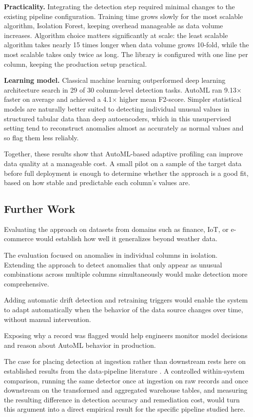 \documentclass[12pt]{article}
\begin{document}
\textbf{Practicality.} Integrating the detection step required minimal changes to the existing pipeline configuration. Training time grows slowly for the most scalable algorithm, Isolation Forest, keeping overhead manageable as data volume increases. Algorithm choice matters significantly at scale: the least scalable algorithm takes nearly 15 times longer when data volume grows 10-fold, while the most scalable takes only twice as long. The library is configured with one line per column, keeping the production setup practical.

\textbf{Learning model.} Classical machine learning outperformed deep learning architecture search in 29 of 30 column-level detection tasks. AutoML ran 9.13$\times$ faster on average and achieved a 4.1$\times$ higher mean F2-score. Simpler statistical models are naturally better suited to detecting individual unusual values in structured tabular data than deep autoencoders, which in this unsupervised setting tend to reconstruct anomalies almost as accurately as normal values and so flag them less reliably.

Together, these results show that AutoML-based adaptive profiling can improve data quality at a manageable cost. A small pilot on a sample of the target data before full deployment is enough to determine whether the approach is a good fit, based on how stable and predictable each column's values are.


\subsection{Further Work}

Evaluating the approach on datasets from domains such as finance, IoT, or e-commerce would establish how well it generalizes beyond weather data.

The evaluation focused on anomalies in individual columns in isolation. Extending the approach to detect anomalies that only appear as unusual combinations across multiple columns simultaneously would make detection more comprehensive.

Adding automatic drift detection and retraining triggers would enable the system to adapt automatically when the behavior of the data source changes over time, without manual intervention.

Exposing why a record was flagged would help engineers monitor model decisions and reason about AutoML behavior in production.

The case for placing detection at ingestion rather than downstream rests here on established results from the data-pipeline literature \cite{kothari2026earlyqa, karlas2025navigating, krishnan2016activeclean}. A controlled within-system comparison, running the same detector once at ingestion on raw records and once downstream on the transformed and aggregated warehouse tables, and measuring the resulting difference in detection accuracy and remediation cost, would turn this argument into a direct empirical result for the specific pipeline studied here.
\end{document}
